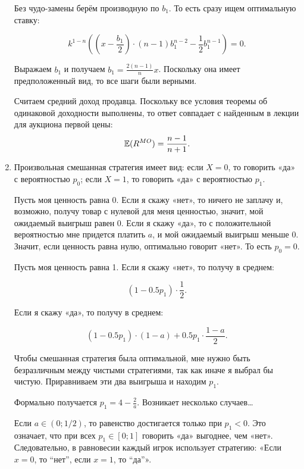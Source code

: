 \begin{enumerate}
Без чудо-замены берём производную по $ b_{1} $. То есть сразу ищем оптимальную ставку:

\begin{equation}
k^{1-n}\left( \left( x-\frac{b_{1}}{2} \right)\cdot (n-1)b_{1}^{n-2}-\frac{1}{2}b_{1}^{n-1} \right)=0.
\end{equation}

Выражаем $ b_{1} $ и получаем $ b_{1}=\frac{2(n-1)}{n}x $. Поскольку она имеет предположенный вид, то все шаги были верными.


Считаем средний доход продавца. Поскольку все условия теоремы об одинаковой доходности выполнены, то ответ совпадает с найденным в лекции для аукциона первой цены:
\begin{equation}
 \operatorname{\mathbb{E}}(R^{MO})=\frac{n-1}{n+1}.
\end{equation}


\item
Произвольная смешанная стратегия имеет вид: если $ X=0 $, то говорить «да» с вероятностью $ p_{0} $; если $ X=1 $, то говорить «да» с вероятностью $ p_{1} $.

Пусть моя ценность равна 0. Если я скажу «нет», то ничего не заплачу и, возможно, получу товар с нулевой для меня ценностью, значит, мой ожидаемый выигрыш равен 0. Если я скажу «да», то с положительной вероятностью мне придется платить $ a $, и мой ожидаемый выигрыш меньше 0. Значит, если ценность равна нулю, оптимально говорит  «нет». То есть $ p_{0}=0 $.

Пусть моя ценность равна 1. Если я скажу «нет», то получу в среднем:

\begin{equation}
(1-0.5p_{1})\cdot \frac{1}{2}.
\end{equation}


Если я скажу «да», то получу в среднем:

\begin{equation}
(1-0.5p_{1})\cdot (1-a)+0.5p_{1}\cdot \frac{1-a}{2}.
\end{equation}

Чтобы смешанная стратегия была оптимальной, мне нужно быть безразличным между чистыми стратегиями, так как иначе я выбрал бы чистую. Приравниваем эти два выигрыша и находим $ p_{1} $.

Формально получается $ p_{1}=4-\frac{2}{a}$. Возникает несколько случаев\ldots

Если $ a\in (0;1/2) $, то равенство достигается только при $ p_{1}<0 $. Это означает, что при всех $ p_{1}\in [0;1] $ говорить «да» выгоднее, чем «нет». Следовательно, в равновесии каждый игрок использует стратегию: «Если $ x=0 $, то “нет”, если $ x=1 $, то “да”».


\end{enumerate}

